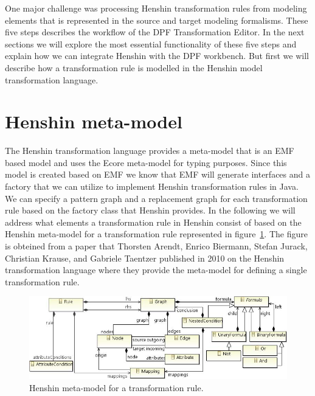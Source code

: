 One major challenge was processing Henshin transformation rules from modeling
elements that is represented in the source and target modeling formalisms.
These five steps describes the workflow of the DPF Transformation Editor. In
the next sections we will explore the most essential functionality of these
five steps and explain how we can integrate Henshin with the DPF workbench. But
first we will describe how a transformation rule is modelled in the Henshin
model transformation language.




\section{Henshin meta-model}
\label{sec:henshin_meta}

The Henshin transformation language provides a meta-model that is an EMF based
model and uses the Ecore meta-model for typing purposes\cite{Arendt2010}. Since
this model is created based on EMF we know that EMF will generate interfaces and
a factory that we can utilize to implement Henshin transformation rules in Java.
We can specify a pattern graph and a replacement graph for each transformation
rule based on the factory class that Henshin provides. In the following we
will address what elements a transformation rule in Henshin consist of based on
the Henshin meta-model for a transformation rule represented in
figure~\ref{fig:Henshin_metamodel}. The figure is obteined from a paper that
Thorsten Arendt, Enrico Biermann, Stefan Jurack, Christian Krause, and Gabriele
Taentzer published in 2010 on the Henshin transformation language where they
provide the meta-model for defining a single transformation
rule\cite{Arendt2010}.

\begin{figure}[H]
	\centering
	\includegraphics[scale=0.8]{./Figures/Henshin_metamodel.png}
	\caption[Henshin meta-model for a transformation rule]
	{Henshin meta-model for a transformation rule.}
	\label{fig:Henshin_metamodel}
\end{figure}

